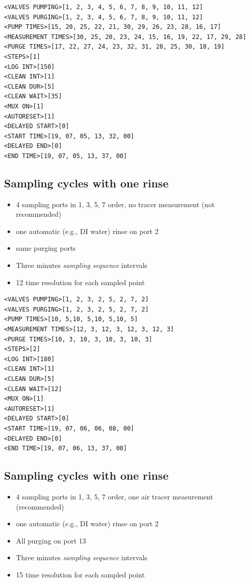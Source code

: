 \documentclass[]{book}
\providecommand{\tightlist}{%
  \setlength{\itemsep}{0pt}\setlength{\parskip}{0pt}}
\begin{document}
\begin{verbatim}
<VALVES PUMPING>[1, 2, 3, 4, 5, 6, 7, 8, 9, 10, 11, 12]
<VALVES PURGING>[1, 2, 3, 4, 5, 6, 7, 8, 9, 10, 11, 12]
<PUMP TIMES>[15, 20, 25, 22, 21, 30, 29, 26, 23, 28, 16, 17]
<MEASUREMENT TIMES>[30, 25, 20, 23, 24, 15, 16, 19, 22, 17, 29, 28]
<PURGE TIMES>[17, 22, 27, 24, 23, 32, 31, 28, 25, 30, 18, 19]
<STEPS>[1]
<LOG INT>[150]
<CLEAN INT>[1]
<CLEAN DUR>[5]
<CLEAN WAIT>[35]
<MUX ON>[1]
<AUTORESET>[1]
<DELAYED START>[0]
<START TIME>[19, 07, 05, 13, 32, 00]
<DELAYED END>[0]
<END TIME>[19, 07, 05, 13, 37, 00]
\end{verbatim}

\hypertarget{sampling-cycles-with-one-rinse}{%
\subsection{Sampling cycles with one rinse}\label{sampling-cycles-with-one-rinse}}

\begin{itemize}
\tightlist
\item
  4 sampling ports in 1, 3, 5, 7 order, no tracer measurement (not recommended)
\item
  one automatic (e.g., DI water) rinse on port 2
\item
  same purging ports
\item
  Three minutes \emph{sampling sequence} intervals
\item
  12 time resolution for each sampled point
\end{itemize}

\begin{verbatim}
<VALVES PUMPING>[1, 2, 3, 2, 5, 2, 7, 2]
<VALVES PURGING>[1, 2, 3, 2, 5, 2, 7, 2]
<PUMP TIMES>[10, 5,10, 5,10, 5,10, 5]
<MEASUREMENT TIMES>[12, 3, 12, 3, 12, 3, 12, 3]
<PURGE TIMES>[10, 3, 10, 3, 10, 3, 10, 3]
<STEPS>[2]
<LOG INT>[180]
<CLEAN INT>[1]
<CLEAN DUR>[5]
<CLEAN WAIT>[12]
<MUX ON>[1]
<AUTORESET>[1]
<DELAYED START>[0]
<START TIME>[19, 07, 06, 06, 08, 00]
<DELAYED END>[0]
<END TIME>[19, 07, 06, 13, 37, 00]
\end{verbatim}

\hypertarget{sampling-cycles-with-one-rinse-1}{%
\subsection{Sampling cycles with one rinse}\label{sampling-cycles-with-one-rinse-1}}

\begin{itemize}
\tightlist
\item
  4 sampling ports in 1, 3, 5, 7 order, one air tracer measurement (recommended)
\item
  one automatic (e.g., DI water) rinse on port 2
\item
  All purging on port 13
\item
  Three minutes \emph{sampling sequence} intervals
\item
  15 time resolution for each sampled point
\end{itemize}
\end{document}
